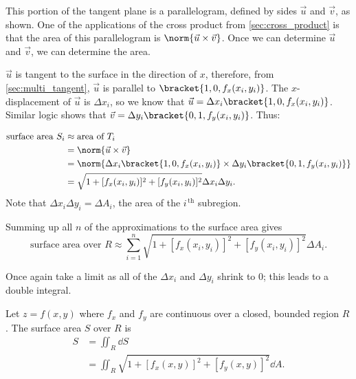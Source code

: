 This portion of the tangent plane is a parallelogram, defined by sides $\vec u$ and $\vec v$, as shown. One of the applications of the cross product from \autoref{sec:cross_product} is that the area of this parallelogram is $\norm{\vec u\times \vec v}$. Once we can determine $\vec u$ and $\vec v$, we can determine the area.

$\vec u$ is tangent to the surface in the direction of $x$, therefore, from \autoref{sec:multi_tangent}, $\vec u$ is parallel to $\bracket{1,0,f_x(x_i,y_i)}$. The $x$-displacement of $\vec u$ is $\Delta x_i$, so we know that $\vec u = \Delta x_i\bracket{1,0,f_x(x_i,y_i)}$. Similar logic shows that $\vec v = \Delta y_i\bracket{0,1,f_y(x_i,y_i)}$. Thus:

\begin{align*}
\text{surface area $S_i$}
	&\approx \text{area of  $T_i$}\\
	&= \norm{\vec u\times \vec v}\\
	&= \norm{\Delta x_i\bracket{1,0,f_x(x_i,y_i)}\times\Delta y_i\bracket{0,1,f_y(x_i,y_i)}}\\
	&=\sqrt{1+[f_x(x_i,y_i)]^2+[f_y(x_i,y_i)]^2}\Delta x_i\Delta y_i.
\end{align*}
Note that $\Delta x_i\Delta y_i = \Delta A_i$, the area of the $i^{\,\text{th}}$ subregion.

Summing up all $n$ of the approximations to the surface area gives
\[\text{surface area over $R$} \approx \sum_{i=1}^n \sqrt{1+[f_x(x_i,y_i)]^2+[f_y(x_i,y_i)]^2}\Delta A_i.\]

Once again take a limit as all of the $\Delta x_i$ and $\Delta y_i$ shrink to 0; this leads to a double integral.


\begin{definition}\label{def:surfacearea}%
Let $z=f(x,y)$ where $f_x$ and $f_y$ are continuous over a closed, bounded region $R$. The surface area $S$ over $R$ is 
\begin{align*}
S &= \iint_R \dd S\\
&=\iint_R \sqrt{1+[f_x(x,y)]^2+[f_y(x,y)]^2}\dd A.
\end{align*}
\end{definition}

